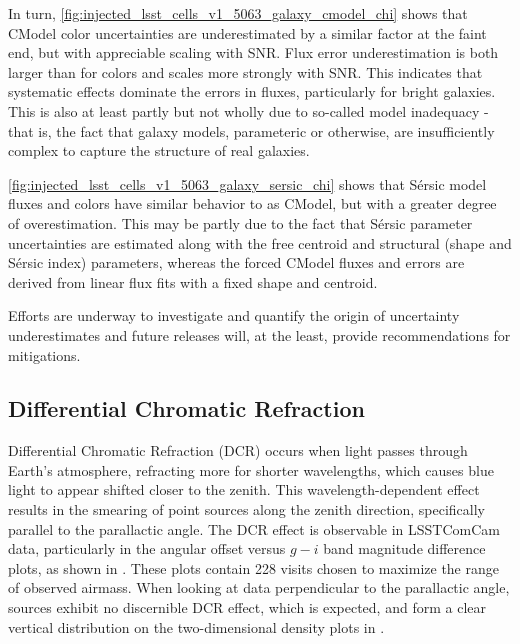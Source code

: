 In turn, \ref{fig:injected_lsst_cells_v1_5063_galaxy_cmodel_chi} shows that CModel color uncertainties are underestimated by a similar factor at the faint end, but with appreciable scaling with \gls{SNR}.
Flux error underestimation is both larger than for colors and scales more strongly with \gls{SNR}.
This indicates that systematic effects dominate the errors in fluxes, particularly for bright galaxies.
This is also at least partly but not wholly due to so-called model inadequacy - that is, the fact that galaxy models, parameteric or otherwise, are insufficiently complex to capture the structure of real galaxies.

\ref{fig:injected_lsst_cells_v1_5063_galaxy_sersic_chi} shows that S\'ersic model fluxes and colors have similar behavior to as CModel, but with a greater degree of overestimation.
This may be partly due to the fact that S\'ersic parameter uncertainties are estimated along with the free centroid and structural (shape and S\'ersic index) parameters, whereas the forced CModel fluxes and errors are derived from linear flux fits with a fixed shape and centroid.

Efforts are underway to investigate and quantify the origin of uncertainty underestimates and future releases will, at the least, provide recommendations for mitigations.

\subsection{Differential Chromatic Refraction}
\label{sec:differential_chromatic_refraction}
\gls{Differential Chromatic Refraction} (DCR) occurs when light passes through Earth’s atmosphere, refracting more for shorter wavelengths, which causes blue light to appear shifted closer to the zenith.
This wavelength-dependent effect results in the smearing of point sources along the zenith direction, specifically parallel to the parallactic angle.
The DCR effect is observable in LSSTComCam data, particularly in the angular offset versus $g-i$ band magnitude difference plots,  as shown in . 
These plots contain 228 visits chosen to maximize the range of observed airmass.
When looking at data perpendicular to the parallactic angle, sources exhibit no discernible DCR effect, which is expected, and form a clear vertical distribution on the two-dimensional density plots in .


